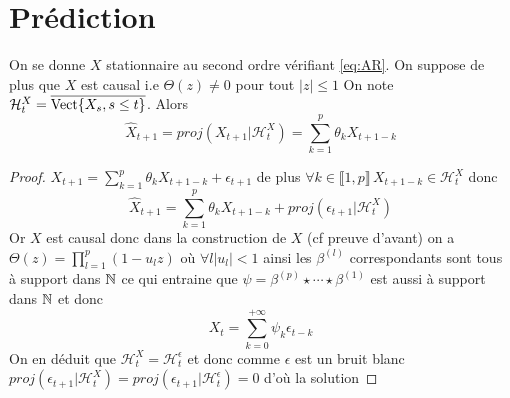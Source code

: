\documentclass{report}
\begin{document}
\section{Prédiction}
\begin{Prop}
On se donne $X$ stationnaire au second ordre vérifiant \eqref{eq:AR}. On suppose de plus que $X$ est causal i.e $\Theta(z) \neq 0$ pour tout $|z| \leq 1$
On note $\mathcal{H}_t^X = \overline{\mathrm{Vect}{ \left\lbrace X_s, s\leq t \right\rbrace }}$. Alors
\[ \hat{X}_{t+1} = proj(X_{t+1} | \mathcal{H}_t^X ) = \sum_{k=1}^p \theta_k X_{t+1-k} \]
\end{Prop}
\begin{proof}
$X_{t+1} = \sum_{k=1}^p \theta_k X_{t+1-k} +\epsilon_{t+1}$ de plus $\forall k \in \llbracket 1,p \rrbracket \, X_{t+1-k} \in \mathcal{H}_t^X$ donc
\[ \hat{X}_{t+1} = \sum_{k=1}^p \theta_k X_{t+1-k} + proj(\epsilon_{t+1} | \mathcal{H}_t^X ) \]
Or $X$ est causal donc dans la construction de $X$ (cf preuve d'avant) on a $\Theta(z)= \prod_{l=1}^p (1-u_l z)$ où $\forall l |u_l|<1$ ainsi les $\beta^{(l)}$ correspondants sont tous à support dans $\mathbb{N}$ ce qui entraine que $\psi = \beta^{(p)} \star \cdots \star \beta^{(1)}$ est aussi à support dans $\mathbb{N}$ et donc 
\[ X_t = \sum_{k=0}^{+\infty} \psi_k \epsilon_{t-k}\] On en déduit que $\mathcal{H}_t^X = \mathcal{H}_t^\epsilon$ et donc comme $\epsilon$ est un bruit blanc $proj(\epsilon_{t+1} | \mathcal{H}_t^X ) = proj(\epsilon_{t+1} | \mathcal{H}_t^\epsilon ) = 0$ d'où la solution
\end{proof}
\end{document}
